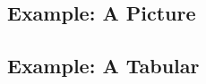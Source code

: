 \begin{slide}
  \newslide
  \pageTransitionReplace


\renewcommand{\makeslidetitle}[1]
{%
  \subsection{#1}%
}


%
\makeslidetitle{ Example: A Picture}\label{Sec:ExPic}

{}{}
\newslide
\pageTransitionReplace


%
\makeslidetitle{ Example: A Tabular}

%
  \newcommand{\tabend}{\\\hline}%


\end{slide}
